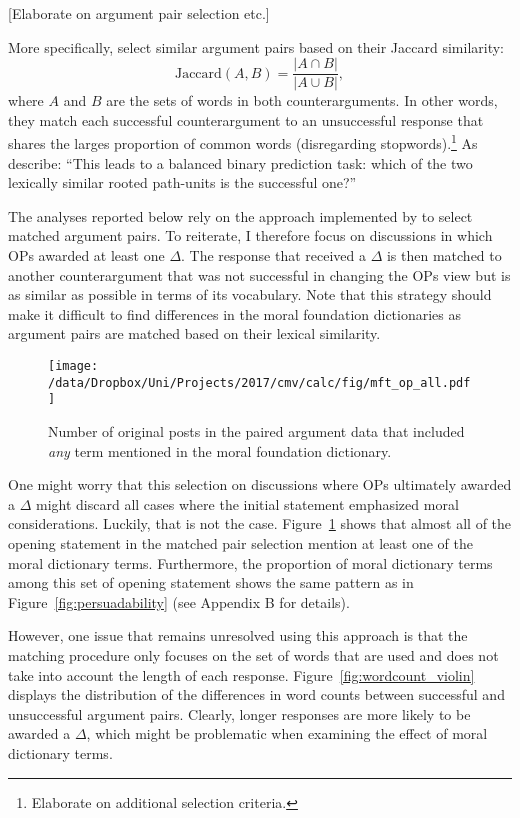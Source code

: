 {[}Elaborate on argument pair selection etc.{]}

More specifically, \citet{tan2016winning} select similar argument pairs based on their Jaccard similarity:
\begin{equation}
\text{Jaccard}(A,B)=\dfrac{|A\cap B|}{|A\cup B|},
\end{equation}
where $A$ and $B$ are the sets of words in both counterarguments. In other words, they match each successful counterargument to an unsuccessful response that shares the larges proportion of common words (disregarding stopwords).\footnote{Elaborate on additional selection criteria.} As \citet[5]{tan2016winning} describe: ``This leads to a balanced binary prediction task: which of the two lexically similar rooted path-units is the successful one?''

The analyses reported below rely on the approach implemented by \citet{tan2016winning} to select matched argument pairs. To reiterate, I therefore focus on discussions in which OPs awarded at least one $\Delta$. The response that received a $\Delta$ is then matched to another counterargument that was not successful in changing  the OPs view but is as similar as possible in terms of its vocabulary. Note that this strategy should make it difficult to find differences in the moral foundation dictionaries as argument pairs are matched based on their lexical similarity.

\begin{figure}[ht]
\centering
\texttt{[image: /data/Dropbox/Uni/Projects/2017/cmv/calc/fig/mft\_op\_all.pdf]}
\caption[Number of original posts in the paired argument data that included \textit{any} term mentioned in the moral foundation dictionary]{Number of original posts in the paired argument data that included \textit{any} term mentioned in the moral foundation dictionary.}\label{fig:mft_op_all}
\end{figure}

One might worry that this selection on discussions where OPs ultimately awarded a $\Delta$ might discard all cases where the initial statement emphasized moral considerations. Luckily, that is not the case. Figure~\ref{fig:mft_op_all} shows that almost all of the opening statement in the matched pair selection mention at least one of the moral dictionary terms. Furthermore, the proportion of moral dictionary terms among this set of opening statement shows the same pattern as in Figure~\ref{fig:persuadability} (see Appendix B for details).

However, one issue that remains unresolved using this approach is that the matching procedure only focuses on the set of words that are used and does not take into account the length of each response. Figure~\ref{fig:wordcount_violin} displays the distribution of the differences in word counts between successful and unsuccessful argument pairs. Clearly, longer responses are more likely to be awarded a $\Delta$, which might be problematic when examining the effect of moral dictionary terms.

